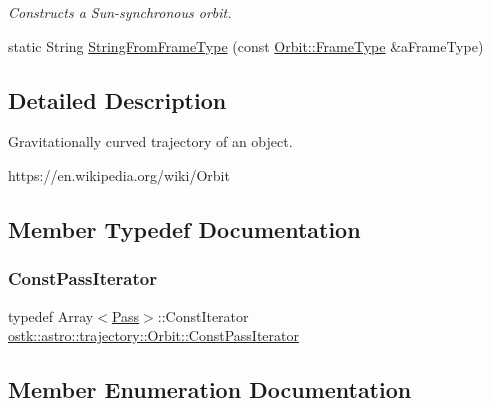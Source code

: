 \begin{DoxyCompactItemize}
\begin{DoxyCompactList}\small\item\em Constructs a Sun-\/synchronous orbit. \end{DoxyCompactList}\item 
static String \hyperlink{classostk_1_1astro_1_1trajectory_1_1_orbit_a329934037eb9eb4cacfcb2a5774753ed}{String\+From\+Frame\+Type} (const \hyperlink{classostk_1_1astro_1_1trajectory_1_1_orbit_a1cc449ad56374471a8ab4300dde979e7}{Orbit\+::\+Frame\+Type} \&a\+Frame\+Type)
\end{DoxyCompactItemize}


\subsection{Detailed Description}
Gravitationally curved trajectory of an object. 

https\+://en.wikipedia.\+org/wiki/\+Orbit 

\subsection{Member Typedef Documentation}
\mbox{\label{classostk_1_1astro_1_1trajectory_1_1_orbit_a0873dc63f4453eb2c07447e2774e944f}} 
\subsubsection{\texorpdfstring{Const\+Pass\+Iterator}{ConstPassIterator}}
{\footnotesize\ttfamily typedef Array$<$\hyperlink{classostk_1_1astro_1_1trajectory_1_1orbit_1_1_pass}{Pass}$>$\+::Const\+Iterator \hyperlink{classostk_1_1astro_1_1trajectory_1_1_orbit_a0873dc63f4453eb2c07447e2774e944f}{ostk\+::astro\+::trajectory\+::\+Orbit\+::\+Const\+Pass\+Iterator}}



\subsection{Member Enumeration Documentation}
\mbox{\label{classostk_1_1astro_1_1trajectory_1_1_orbit_a1cc449ad56374471a8ab4300dde979e7}} 
